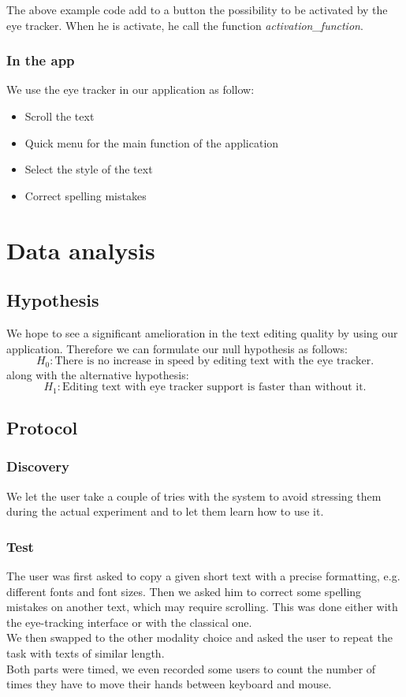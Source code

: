 \documentclass[12pt, a4paper, twoside]{article}
\begin{document}
The above example code add to a button the possibility to be activated by the eye tracker. When he is activate, he call the function \textit{activation\_function}.

\subsubsection{In the app}
We use the eye tracker in our application as follow:
\begin{itemize}
\item Scroll the text
\item Quick menu for the main function of the application
\item Select the style of the text
\item Correct spelling mistakes
\end{itemize}

\section{Data analysis}

\subsection{Hypothesis}
We hope to see a significant amelioration in the text editing quality by using our application. Therefore we can formulate our null hypothesis as follows: 
\[H_0: \text{There is no increase in speed by editing text with the eye tracker.}\] 
along with the alternative hypothesis: 
\[H_1: \text{Editing text with eye tracker support is faster than without it.}\]

\subsection{Protocol}

\subsubsection{Discovery}
We let the user take a couple of tries with the system to avoid stressing them during the actual experiment and to let them learn how to use it. 

\subsubsection{Test}
The user was first asked to copy a given short text with a precise formatting, e.g. different fonts and font sizes. Then we asked him to correct some spelling mistakes on another text, which may require scrolling. This was done either with the eye-tracking interface or with the classical one. \\
We then swapped to the other modality choice and asked the user to repeat the task with texts of similar length. \\
Both parts were timed, we even recorded some users to count the number of times they have to move their hands between keyboard and mouse. 
\end{document}

